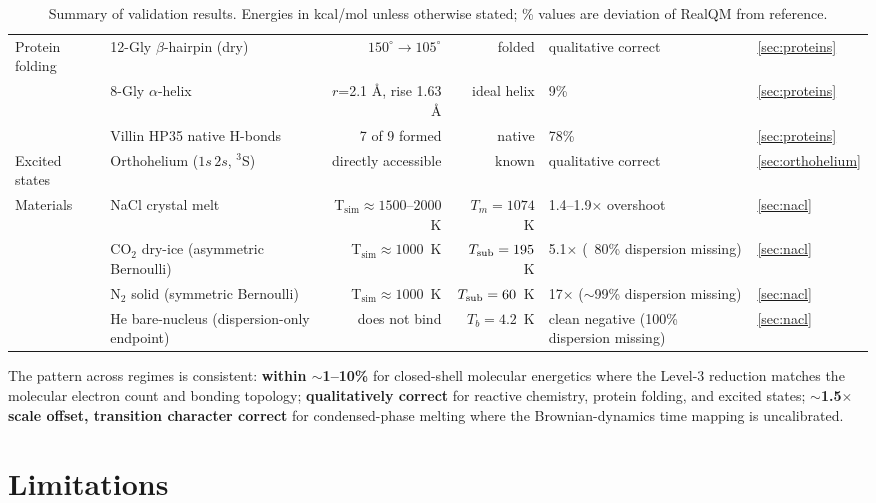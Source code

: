 \documentclass[11pt]{article}
\begin{document}
\begin{table}[h!]
\begin{tabular}{l l r r l l}
\midrule
Protein folding        & 12-Gly $\beta$-hairpin (dry)     & $150^\circ \to 105^\circ$ & folded   & qualitative correct  & \ref{sec:proteins}  \\
                       & 8-Gly $\alpha$-helix             & $r$=2.1 \AA, rise 1.63 \AA & ideal helix & 9\%             & \ref{sec:proteins}  \\
                       & Villin HP35 native H-bonds       & 7 of 9 formed         & native       & 78\%                  & \ref{sec:proteins}  \\
\midrule
Excited states         & Orthohelium ($1s\,2s$, $^3$S)    & directly accessible  & known         & qualitative correct & \ref{sec:orthohelium}\\
\midrule
Materials              & NaCl crystal melt              & T$_\mathrm{sim} \approx 1500$--$2000$~K & $T_m = 1074$~K & 1.4--1.9$\times$ overshoot                & \ref{sec:nacl}     \\
                       & CO$_2$ dry-ice (asymmetric Bernoulli) & T$_\mathrm{sim} \approx 1000$~K  & $T_{\rm sub} = 195$~K  & 5.1$\times$ (~80\% dispersion missing)        & \ref{sec:nacl}     \\
                       & N$_2$ solid (symmetric Bernoulli) & T$_\mathrm{sim} \approx 1000$~K  & $T_{\rm sub} = 60$~K   & 17$\times$ ($\sim$99\% dispersion missing)    & \ref{sec:nacl}     \\
                       & He bare-nucleus (dispersion-only endpoint) & does not bind  & $T_b = 4.2$~K   & clean negative (100\% dispersion missing)    & \ref{sec:nacl}     \\
\bottomrule
\end{tabular}
\caption{Summary of validation results. Energies in kcal/mol unless otherwise stated; \% values are deviation of RealQM from reference.}
\label{tab:summary}
\end{table}

The pattern across regimes is consistent: \textbf{within $\sim$1--10\%} for closed-shell molecular energetics where the Level-3 reduction matches the molecular electron count and bonding topology; \textbf{qualitatively correct} for reactive chemistry, protein folding, and excited states; \textbf{$\sim$1.5$\times$ scale offset, transition character correct} for condensed-phase melting where the Brownian-dynamics time mapping is uncalibrated.

\section{Limitations}\label{sec:limitations}
\end{document}
